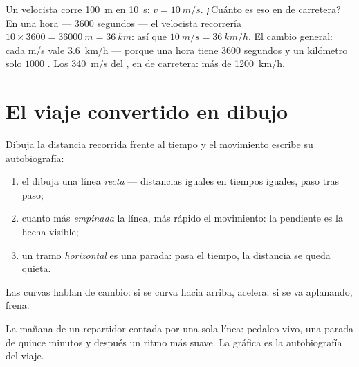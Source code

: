 \begin{example}\label{ex:g7:motion-average-speed:units}
Un velocista corre \qty{100}{m} en \qty{10}{s}: $v = \qty{10}{m/s}$.
¿Cuánto es eso en  de carretera? En una hora --- $3600$
segundos --- el velocista recorrería $10 \times 3600 = \qty{36000}{m}
= \qty{36}{km}$: así que $\qty{10}{m/s} = \qty{36}{km/h}$. El cambio
general: cada \unit{m/s} vale \qty{3.6}{km/h} --- porque una hora
tiene $3600$ segundos y un kilómetro solo $1000$ . Los
\qty{340}{m/s} del , en  de carretera: más de
\qty{1200}{km/h}.
\end{example}

\section{El viaje convertido en dibujo}

\begin{proposition}\label{prop:g7:motion-average-speed:graphs}
Dibuja la distancia recorrida frente al tiempo y el movimiento escribe
su autobiografía:
\begin{enumerate}
  \item el  dibuja una línea \emph{recta} ---
        distancias iguales en tiempos iguales, paso tras paso;
  \item cuanto más \emph{empinada} la línea, más rápido el
        movimiento: la pendiente es la  hecha visible;
  \item un tramo \emph{horizontal} es una parada: pasa el tiempo, la
        distancia se queda quieta.
\end{enumerate}
Las curvas hablan de cambio: si se curva hacia arriba, acelera; si se
va aplanando, frena.
\end{proposition}

\begin{omfigure}

{\small La mañana de un repartidor contada por una sola línea:
pedaleo vivo, una parada de quince minutos y después un ritmo más
suave. La gráfica es la autobiografía del viaje.}
\end{omfigure}

